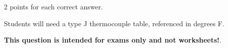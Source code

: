 2 points for each correct answer.







Students will need a type J thermocouple table, referenced in degrees F.

\vskip 10pt

{\bf This question is intended for exams only and not worksheets!}.




